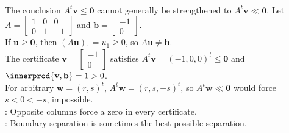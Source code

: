 \begin{example} \label{ex:farkas-weak-inequality-necessary} \\
The conclusion $A^t\mathbf{v}\leq\mathbf{0}$ cannot generally be strengthened to $A^t\mathbf{v}\ll\mathbf{0}$. Let $A=
\begin{bmatrix}
1 & 0 & 0\\
0 & 1 & -1
\end{bmatrix}$ and $\mathbf{b}=
\begin{bmatrix}
-1\\
0
\end{bmatrix}$.\\
If $\mathbf{u}\geq\mathbf{0}$, then $(A\mathbf{u})_1=u_1\geq0$, so $A\mathbf{u}\neq\mathbf{b}$.\\
The certificate $\mathbf{v}=
\begin{bmatrix}
-1\\
0
\end{bmatrix}$ satisfies $A^t\mathbf{v}=(-1,0,0)^t\leq\mathbf{0}$ and $\innerprod{\mathbf{v},\mathbf{b}}=1>0$.\\
For arbitrary $\mathbf{w}=(r,s)^t$, $A^t\mathbf{w}=(r,s,-s)^t$, so $A^t\mathbf{w}\ll\mathbf{0}$ would force $s<0<-s$, impossible.\\
: Opposite columns force a zero in every certificate.\\
: Boundary separation is sometimes the best possible separation.
\end{example}
